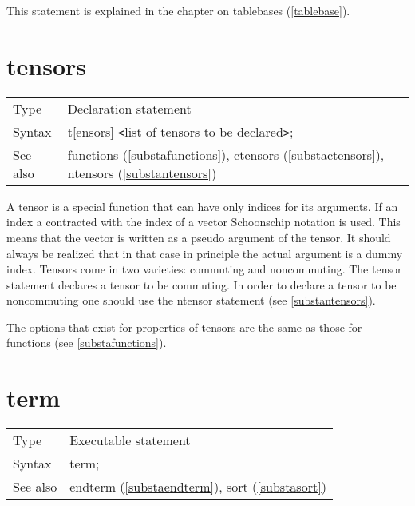 \noindent This statement is explained in the chapter on 
tablebases (\ref{tablebase}).
\vspace{10mm}

 
\section{tensors}
\label{substatensors}

\noindent \begin{tabular}{ll}
Type & Declaration statement\\
Syntax & t[ensors] {\tt<}list of tensors to be declared{\tt>}; \\
See also & functions (\ref{substafunctions}), ctensors 
        (\ref{substactensors}), ntensors (\ref{substantensors})
\end{tabular}\vspace{4mm}

\noindent A tensor is a special function that can have only 
indices for its arguments. If an index a contracted with the index of a 
vector Schoonschip notation is used. This means that the 
vector is written as a pseudo argument of the tensor. It should always be 
realized that in that case in principle the actual argument is a dummy 
index. Tensors come in two varieties: commuting and 
noncommuting. The tensor statement declares a tensor to 
be commuting. In order to declare a tensor to be noncommuting one should 
use the ntensor statement (see \ref{substantensors}).

\noindent The options that exist for properties of tensors are the same as 
those for functions (see \ref{substafunctions}). \vspace{10mm}


\section{term}
\label{substaterm}

\noindent \begin{tabular}{ll}
Type & Executable statement\\
Syntax & term;
\\ See also & endterm (\ref{substaendterm}), sort (\ref{substasort})
\end{tabular} \vspace{4mm}

